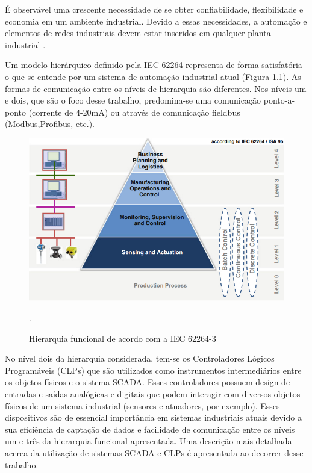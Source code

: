 \label{Cap:introducao}

É observável uma crescente necessidade de se obter confiabilidade, flexibilidade e economia em um ambiente industrial. Devido a essas necessidades, a automação e elementos de redes industriais devem estar inseridos em qualquer planta industrial \cite{salazar2006instrumentaccao}. 

Um modelo hierárquico definido pela IEC 62264 representa de forma satisfatória o que se entende por um sistema de automação industrial atual (Figura \ref{fig:Hierarquia}.1). As formas de comunicação entre os níveis de hierarquia são diferentes. Nos níveis um e dois, que são o foco desse trabalho, predomina-se uma comunicação ponto-a-ponto (corrente de 4-20mA) ou através de comunicação fieldbus (Modbus,Profibus, etc.).


\begin{figure}[h!]
  \center
  \includegraphics[scale=0.8]{Hierarquia.png}
  \label{fig:Hierarquia}
  \caption{Hierarquia funcional de acordo com a IEC 62264-3} \cite{colombo2014industrial}.
\end{figure}


No nível dois da hierarquia considerada, tem-se os Controladores Lógicos Programáveis (CLPs) que são utilizados como instrumentos intermediários entre os objetos físicos e o sistema SCADA. Esses controladores possuem design de entradas e saídas analógicas e digitais que podem interagir com  diversos objetos físicos de um sistema industrial (sensores e atuadores, por exemplo). Esses dispositivos são de essencial importância em sistemas industriais atuais devido a sua eficiência de captação de dados e facilidade de comunicação entre os níveis um e três da hierarquia funcional apresentada. Uma descrição mais detalhada acerca da utilização de sistemas SCADA e CLPs é apresentada ao decorrer desse trabalho. 

